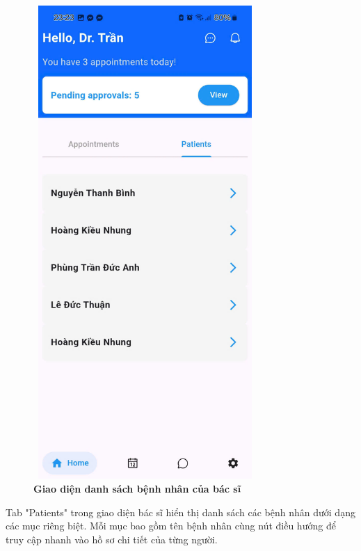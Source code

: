 \begin{figure}[H]
	\centering
	\includegraphics[width=8.5cm,height=18cm]{Images/AppUI/homePage2Doctor.jpg}
	\caption[Giao diện danh sách bệnh nhân của bác sĩ]{\bfseries \fontsize{12pt}{0pt}\selectfont Giao diện danh sách bệnh nhân của bác sĩ}
	\label{patientListDoctor}
\end{figure}
Tab "Patients" trong giao diện bác sĩ hiển thị danh sách các bệnh nhân dưới dạng các mục riêng biệt. Mỗi mục bao gồm tên bệnh nhân cùng nút điều hướng để truy cập nhanh vào hồ sơ chi tiết của từng người.

